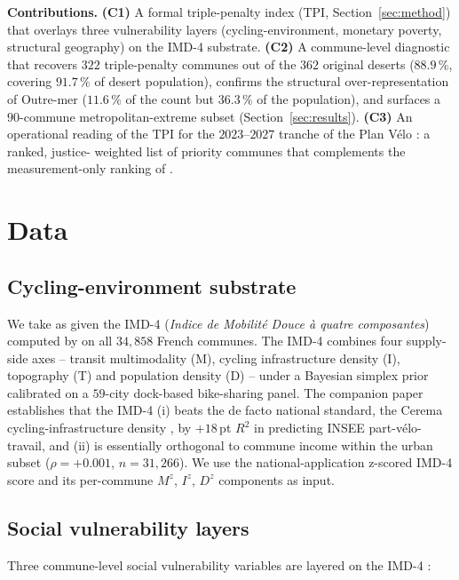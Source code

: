 \documentclass[11pt,a4paper]{article}
\newcommand{\TPI}{\mathrm{TPI}}
\begin{document}
\noindent\textbf{Contributions.}
\textbf{(C1)} A formal triple-penalty index ($\TPI$,
Section~\ref{sec:method}) that overlays three vulnerability
layers (cycling-environment, monetary poverty, structural
geography) on the IMD-4 substrate.
\textbf{(C2)} A commune-level diagnostic that recovers $322$
triple-penalty communes out of the $362$ original deserts
($88.9\,\%$, covering $91.7\,\%$ of desert population), confirms
the structural over-representation of Outre-mer ($11.6\,\%$ of
the count but $36.3\,\%$ of the population), and surfaces a
$90$-commune metropolitan-extreme subset
(Section~\ref{sec:results}).
\textbf{(C3)} An operational reading of the $\TPI$ for the
$2023$--$2027$ tranche of the Plan V\'elo : a ranked, justice-
weighted list of priority communes that complements the
measurement-only ranking of \citet{Fosse2026imd_national}.

\section{Data}
\label{sec:data}

\subsection{Cycling-environment substrate}

We take as given the IMD-4 (\emph{Indice de Mobilit\'e Douce \`a
quatre composantes}) computed by \citet{Fosse2026imd_national} on
all $34{,}858$ French communes.  The IMD-4 combines four
supply-side axes -- transit multimodality (M), cycling
infrastructure density (I), topography (T) and population density
(D) -- under a Bayesian simplex prior calibrated on a $59$-city
dock-based bike-sharing panel.  The companion paper establishes
that the IMD-4 (i) beats the de facto national standard, the
Cerema cycling-infrastructure density \citep{Cerema2021Velo}, by
$+18\,$pt $R^2$ in predicting INSEE part-v\'elo-travail, and
(ii) is essentially orthogonal to commune income within the urban
subset ($\rho = +0.001$, $n = 31{,}266$).  We use the
national-application z-scored IMD-4 score and its per-commune
$M^z$, $I^z$, $D^z$ components as input.

\subsection{Social vulnerability layers}

Three commune-level social vulnerability variables are layered on
the IMD-4 :
\end{document}
